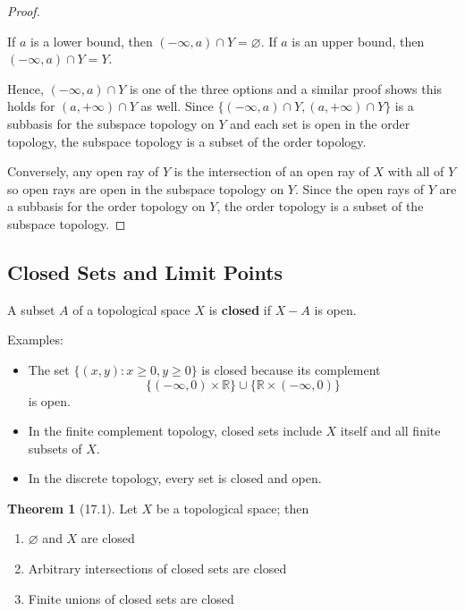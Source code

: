 \documentclass{article}
\newcommand{\nline}{\vspace*{0.5\baselineskip}}
\theoremstyle{definition}
\newtheorem{theorem}{Theorem}[subsection]
\begin{document}
\begin{flushleft}
\begin{proof}
\begin{itemize}

    If $a$ is a lower bound, then $(-\infty, a) \cap Y = \varnothing$. If $a$ is an upper bound, then $(-\infty, a) \cap Y = Y$.
\end{itemize}
Hence, $(-\infty, a) \cap Y$ is one of the three options and a similar proof shows this holds for $(a, +\infty) \cap Y$ as well. Since $\{ (-\infty, a) \cap Y, (a, +\infty) \cap Y \}$ is a subbasis for the subspace topology on $Y$ and each set is open in the order topology, the subspace topology is a subset of the order topology.

\nline

Conversely, any open ray of $Y$ is the intersection of an open ray of $X$ with all of $Y$ so open rays are open in the subspace topology on $Y$. Since the open rays of $Y$ are a subbasis for the order topology on $Y$, the order topology is a subset of the subspace topology.
\end{proof}

\subsection{Closed Sets and Limit Points}

A subset $A$ of a topological space $X$ is \textbf{closed} if $X - A$ is open.

\nline

Examples:
\begin{itemize}
    \item The set $\{ (x,y) : x \geq 0, y \geq 0 \}$ is closed because its complement
    \[
    \{ (-\infty, 0) \times \mathbb{R} \} \cup \{ \mathbb{R} \times (-\infty, 0) \}
    \]
    is open.
    \item In the finite complement topology, closed sets include $X$ itself and all finite subsets of $X$.
    \item In the discrete topology, every set is closed and open.
\end{itemize}

\begin{theorem}[17.1]
Let $X$ be a topological space; then
\begin{enumerate}
    \item $\varnothing$ and $X$ are closed
    \item Arbitrary intersections of closed sets are closed
    \item Finite unions of closed sets are closed
\end{enumerate}
\end{theorem}


\end{flushleft}
\end{document}
